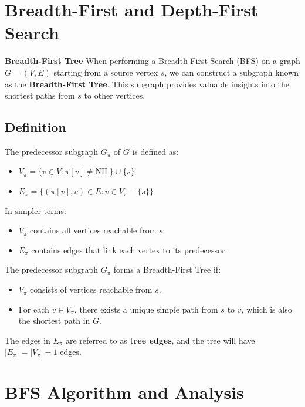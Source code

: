 \newpage
\section{Breadth-First and Depth-First Search}

\textbf{Breadth-First Tree}
When performing a Breadth-First Search (BFS) on a graph $G = (V, E)$ starting from a source vertex $s$, we can construct a subgraph known as the \textbf{Breadth-First Tree}. This subgraph provides valuable insights into the shortest paths from $s$ to other vertices.

\subsection{Definition}
The predecessor subgraph $G_\pi$ of $G$ is defined as:
\begin{itemize}
    \item $V_\pi = \{v \in V : \pi[v] \neq \text{NIL}\} \cup \{s\}$
    \item $E_\pi = \{(\pi[v], v) \in E : v \in V_\pi - \{s\} \}$
\end{itemize}
In simpler terms:
\begin{itemize}
    \item $V_\pi$ contains all vertices reachable from $s$.
    \item $E_\pi$ contains edges that link each vertex to its predecessor.
\end{itemize}
The predecessor subgraph $G_\pi$ forms a Breadth-First Tree if:
\begin{itemize}
    \item $V_\pi$ consists of vertices reachable from $s$.
    \item For each $v \in V_\pi$, there exists a unique simple path from $s$ to $v$, which is also the shortest path in $G$.
\end{itemize}
The edges in $E_\pi$ are referred to as \textbf{tree edges}, and the tree will have $|E_\pi| = |V_\pi| - 1$ edges.

\section{BFS Algorithm and Analysis}
